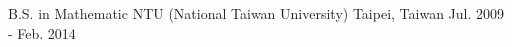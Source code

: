 

\begin{cventries}

  \cventry
  {B.S. in Mathematic} %
  {NTU (National Taiwan University)} %
  {Taipei, Taiwan} %
  {Jul. 2009 - Feb. 2014} %
  {
  }

\end{cventries}
